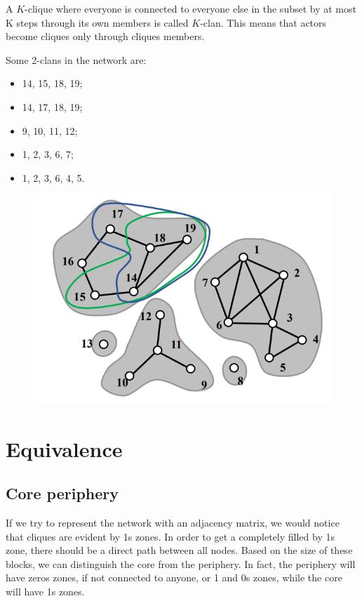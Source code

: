 \documentclass[
  notitlepage,
  onecolumn,
  openany]{book}
\providecommand{\tightlist}{%
  \setlength{\itemsep}{0pt}\setlength{\parskip}{0pt}}
\begin{document}
A \(K\)-clique where everyone is connected to everyone else in the subset by at most K steps through its own members is called \(K\)-clan. This means that actors become cliques only through cliques members.

Some 2-clans in the network are:

\begin{itemize}
\tightlist
\item
  14, 15, 18, 19;
\item
  14, 17, 18, 19;
\item
  9, 10, 11, 12;
\item
  1, 2, 3, 6, 7;
\item
  1, 2, 3, 6, 4, 5.
\end{itemize}

\begin{figure}[h!]

{\centering \includegraphics[width=0.5\linewidth]{images/11-Subgroups and Structural Equivalence/Untitled 2} 

}

\end{figure}

\hypertarget{equivalence}{%
\section{Equivalence}\label{equivalence}}

\hypertarget{core-periphery}{%
\subsection{Core periphery}\label{core-periphery}}

If we try to represent the network with an adjacency matrix, we would notice that cliques are evident by 1s zones. In order to get a completely filled by 1s zone, there should be a direct path between all nodes. Based on the size of these blocks, we can distinguish the core from the periphery. In fact, the periphery will have zeros zones, if not connected to anyone, or 1 and 0s zones, while the core will have 1s zones.
\end{document}
